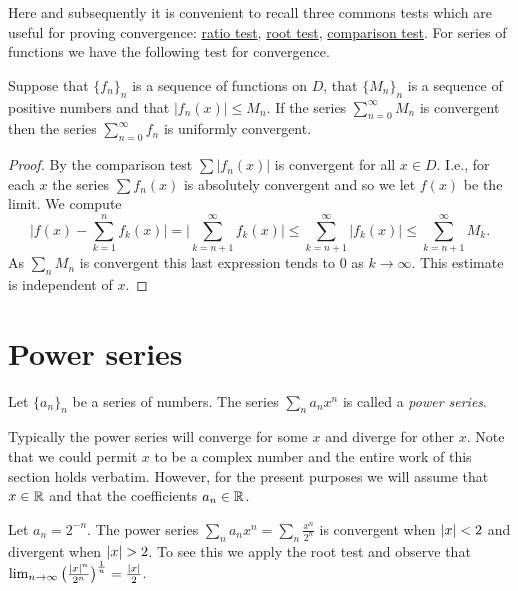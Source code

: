 Here and subsequently it is convenient to recall three commons tests which are useful for proving convergence:
\href{https://en.wikipedia.org/wiki/Ratio_test}{ratio test},
\href{https://en.wikipedia.org/wiki/Root_test}{root test},
\href{https://en.wikipedia.org/wiki/Direct_comparison_test}{comparison test}.
%
For series of functions we have the following test for convergence.

\begin{theorem}
  Suppose that \({\{f_n\}}_n\) is a sequence of functions on \(D\), that \({\{M_n\}}_n\) is a sequence of positive numbers
  and that \(|f_n(x)|\leq M_n\).
  If the series \(\sum_{n=0}^{\infty}M_n\) is convergent then the series \(\sum_{n=0}^{\infty}f_n\) is uniformly convergent.
\end{theorem}



\begin{proof}
  By the comparison test \(\sum |f_n(x)| \) is convergent for all \(x\in D\).
  I.e., for each \(x\) the series \(\sum f_n(x) \) is absolutely convergent and so we let \(f(x)\) be the limit.
  We compute
  \[
    \Big|f(x) - \sum_{k=1}^{n} f_k(x)  \Big|
    =
    \Big|\sum_{k=n+1}^{\infty} f_k(x)  \Big|
    \leq \sum_{k=n+1}^{\infty} |f_k(x)|
    \leq  \sum_{k=n+1}^{\infty} M_k.
  \]
  As \(\sum_{n}M_n\) is convergent this last expression tends to \(0\) as \(k\to \infty\).
  This estimate is independent of \(x\).
\end{proof}




\section{Power series}



\begin{definition}
  Let \({\{a_n\}}_{n}\) be a series of numbers.
  The series
  \(\sum_{n} a_n x^n\)
  is called a \emph{power series}.
\end{definition}
Typically the power series will converge for some \(x\) and diverge for other \(x\).
Note that we could permit \(x\) to be a complex number and the entire work of this section holds verbatim.
However, for the present purposes we will assume that \(x \in \mathbb{R}\) and that the coefficients \(a_n \in \mathbb{R}\).

\begin{example*}
  Let \(a_n = 2^{-n}\).
  The power series \(\sum_{n} a_n x^n = \sum_{n}\frac{x^n}{2^n}\) is convergent when \(\left|x\right|<2\) and divergent  when \(\left|x\right| > 2\).
  To see this we apply the root test and observe that  \(\lim_{n\to\infty}\big(\frac{\left|x\right|^n}{2^n} \big)^{\frac{1}{n}}=\frac{\left|x\right|}{2}\).
\end{example*}

